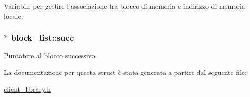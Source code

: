 Variabile per gestire l'associazione tra blocco di memoria e indirizzo di memoria locale. 

\hypertarget{structblock__list_55fb1bd769461ad9b55a7ad08d959665_55fb1bd769461ad9b55a7ad08d959665}{
\subsubsection[{succ}]{$\ast$ {\bf block\_\-list::succ}}}
\label{structblock__list_55fb1bd769461ad9b55a7ad08d959665_55fb1bd769461ad9b55a7ad08d959665}


Puntatore al blocco successivo. 



La documentazione per questa struct è stata generata a partire dal seguente file:\begin{CompactItemize}
\item 
\hyperlink{client__library_8h}{client\_\-library.h}\end{CompactItemize}
